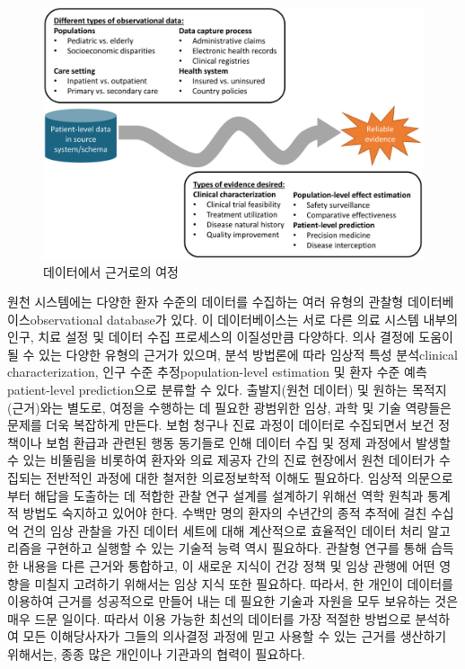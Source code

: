 \documentclass[11pt]{book}
\theoremstyle{definition}
\theoremstyle{definition}
\theoremstyle{definition}
\theoremstyle{remark}
\begin{document}
\begin{figure}

{\centering \includegraphics[width=1\linewidth]{images/OhdsiCommunity/datajourney} 

}

\caption{데이터에서 근거로의 여정}\label{fig:datajourney}
\end{figure}

원천 시스템에는 다양한 환자 수준의 데이터를 수집하는 여러 유형의 관찰형
데이터베이스observational database가 있다. 이 데이터베이스는 서로 다른
의료 시스템 내부의 인구, 치료 설정 및 데이터 수집 프로세스의 이질성만큼
다양하다. 의사 결정에 도움이 될 수 있는 다양한 유형의 근거가 있으며,
분석 방법론에 따라 임상적 특성 분석clinical characterization, 인구 수준
추정population-level estimation 및 환자 수준 예측patient-level
prediction으로 분류할 수 있다. 출발지(원천 데이터) 및 원하는
목적지(근거)와는 별도로, 여정을 수행하는 데 필요한 광범위한 임상, 과학
및 기술 역량들은 문제를 더욱 복잡하게 만든다. 보험 청구나 진료 과정이
데이터로 수집되면서 보건 정책이나 보험 환급과 관련된 행동 동기들로 인해
데이터 수집 및 정제 과정에서 발생할 수 있는 비뚤림을 비롯하여 환자와
의료 제공자 간의 진료 현장에서 원천 데이터가 수집되는 전반적인 과정에
대한 철저한 의료정보학적 이해도 필요하다. 임상적 의문으로부터 해답을
도출하는 데 적합한 관찰 연구 설계를 설계하기 위해선 역학 원칙과 통계적
방법도 숙지하고 있어야 한다. 수백만 명의 환자의 수년간의 종적 추적에
걸친 수십억 건의 임상 관찰을 가진 데이터 세트에 대해 계산적으로 효율적인
데이터 처리 알고리즘을 구현하고 실행할 수 있는 기술적 능력 역시
필요하다. 관찰형 연구를 통해 습득한 내용을 다른 근거와 통합하고, 이
새로운 지식이 건강 정책 및 임상 관행에 어떤 영향을 미칠지 고려하기
위해서는 임상 지식 또한 필요하다. 따라서, 한 개인이 데이터를 이용하여
근거를 성공적으로 만들어 내는 데 필요한 기술과 자원을 모두 보유하는 것은
매우 드문 일이다. 따라서 이용 가능한 최선의 데이터를 가장 적절한
방법으로 분석하여 모든 이해당사자가 그들의 의사결정 과정에 믿고 사용할
수 있는 근거를 생산하기 위해서는, 종종 많은 개인이나 기관과의 협력이
필요하다.
\end{document}
